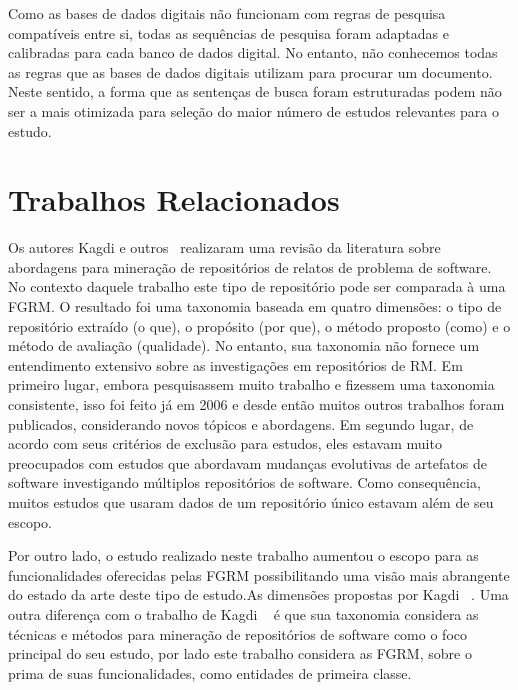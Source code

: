 Como as bases de dados digitais não funcionam com regras de
pesquisa compatíveis entre si, todas as sequências de pesquisa foram adaptadas e
calibradas para cada banco de dados digital. No entanto, não conhecemos todas as
regras que as bases de dados digitais utilizam para procurar um documento. Neste
sentido, a forma que as sentenças de busca foram estruturadas podem não ser a
mais otimizada para seleção do maior número de estudos relevantes para o estudo.

\section{Trabalhos Relacionados}
\label{sec:trabalhos_relacionados}

Os autores Kagdi e outros~\cite{kagdi2012assigning} realizaram uma revisão da
literatura sobre abordagens para mineração de repositórios de relatos de
problema de software. No contexto daquele trabalho este tipo de repositório pode
ser comparada à uma FGRM\@. O resultado foi uma taxonomia baseada em quatro
dimensões: o tipo de repositório extraído (o que), o propósito (por que), o
método proposto (como) e o método de avaliação (qualidade). No entanto, sua
taxonomia não fornece um entendimento extensivo sobre as investigações em
repositórios de RM. Em primeiro lugar, embora pesquisassem muito trabalho e
fizessem uma taxonomia consistente, isso foi feito já em 2006 e desde então
muitos outros trabalhos foram publicados, considerando novos tópicos e
abordagens. Em segundo lugar, de acordo com seus critérios de exclusão para
estudos, eles estavam muito preocupados com estudos que abordavam mudanças
evolutivas de artefatos de software investigando múltiplos repositórios de
software. Como consequência, muitos estudos que usaram dados de um repositório
único estavam além de seu escopo.

Por outro lado, o estudo realizado neste trabalho aumentou o escopo para as
funcionalidades oferecidas pelas FGRM possibilitando uma visão mais abrangente
do estado da arte deste tipo de estudo.As dimensões propostas por Kagdi
~\cite{kagdi2012assigning}. Uma outra diferença com o trabalho de Kagdi
~\cite{kagdi2012assigning} é que sua taxonomia considera as técnicas e métodos
para mineração de repositórios de software como o foco principal do seu estudo,
por lado este trabalho considera as FGRM, sobre o prima de suas funcionalidades,
como entidades de primeira classe.

